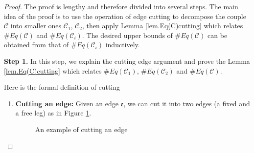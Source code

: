 \begin{proof} 
The proof is lengthy and therefore divided into several steps. The main idea of the proof is to use the operation of edge cutting to decompose the couple $\mathcal{C}$ into smaller ones $\mathcal{C}_1$, $\mathcal{C}_2$, then apply Lemma \ref{lem.Eq(C)cutting} which relates $\#Eq(\mathcal{C})$ and $\#Eq(\mathcal{C}_i)$. The desired upper bounds of $\#Eq(\mathcal{C})$ can be obtained from that of $\#Eq(\mathcal{C}_i)$ inductively.


\textbf{Step 1.} In this step, we explain the cutting edge argument and prove the Lemma \ref{lem.Eq(C)cutting} which relates $\#Eq(\mathcal{C}_1)$, $\#Eq(\mathcal{C}_2)$ and $\#Eq(\mathcal{C})$.

Here is the formal definition of cutting 

\begin{defn}
\begin{enumerate}
    \item \textbf{Cutting an edge:} Given an edge $\mathfrak{e}$, we can cut it into two edges (a fixed and a free leg) as in Figure \ref{fig.cutedge}.
    
   \begin{figure}[H]
    \centering
        \caption{An example of cutting an edge}
        \label{fig.cutedge}
    \end{figure}


\end{enumerate}
\end{defn}
\end{proof}
